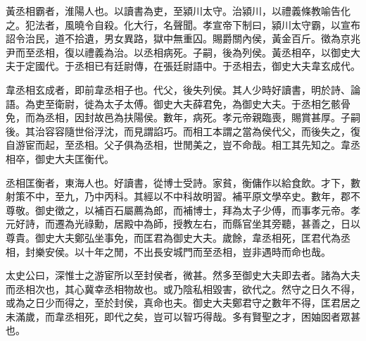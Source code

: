 黃丞相霸者，淮陽人也。以讀書為吏，至潁川太守。治潁川，以禮義條教喻告化之。犯法者，風曉令自殺。化大行，名聲聞。孝宣帝下制曰，潁川太守霸，以宣布詔令治民，道不拾遺，男女異路，獄中無重囚。賜爵關內侯，黃金百斤。徵為京兆尹而至丞相，復以禮義為治。以丞相病死。子嗣，後為列侯。黃丞相卒，以御史大夫于定國代。于丞相已有廷尉傳，在張廷尉語中。于丞相去，御史大夫韋玄成代。

韋丞相玄成者，即前韋丞相子也。代父，後失列侯。其人少時好讀書，明於詩、論語。為吏至衛尉，徙為太子太傅。御史大夫薛君免，為御史大夫。于丞相乞骸骨免，而為丞相，因封故邑為扶陽侯。數年，病死。孝元帝親臨喪，賜賞甚厚。子嗣後。其治容容隨世俗浮沈，而見謂諂巧。而相工本謂之當為侯代父，而後失之，復自游宦而起，至丞相。父子俱為丞相，世閒美之，豈不命哉。相工其先知之。韋丞相卒，御史大夫匡衡代。

丞相匡衡者，東海人也。好讀書，從博士受詩。家貧，衡傭作以給食飲。才下，數射策不中，至九，乃中丙科。其經以不中科故明習。補平原文學卒史。數年，郡不尊敬。御史徵之，以補百石屬薦為郎，而補博士，拜為太子少傅，而事孝元帝。孝元好詩，而遷為光祿勳，居殿中為師，授教左右，而縣官坐其旁聽，甚善之，日以尊貴。御史大夫鄭弘坐事免，而匡君為御史大夫。歲餘，韋丞相死，匡君代為丞相，封樂安侯。以十年之閒，不出長安城門而至丞相，豈非遇時而命也哉。

太史公曰，深惟士之游宦所以至封侯者，微甚。然多至御史大夫即去者。諸為大夫而丞相次也，其心冀幸丞相物故也。或乃陰私相毀害，欲代之。然守之日久不得，或為之日少而得之，至於封侯，真命也夫。御史大夫鄭君守之數年不得，匡君居之未滿歲，而韋丞相死，即代之矣，豈可以智巧得哉。多有賢聖之才，困妯囡者眾甚也。